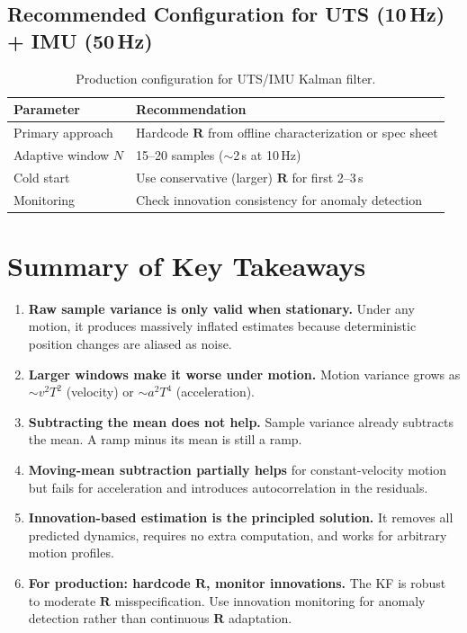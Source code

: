 \documentclass[11pt,a4paper]{article}
\begin{document}
\subsection{Recommended Configuration for UTS (10\,Hz) + IMU (50\,Hz)}

\begin{table}[H]
\centering
\begin{tabular}{@{}ll@{}}
\toprule
\textbf{Parameter} & \textbf{Recommendation} \\
\midrule
Primary approach    & Hardcode $\mathbf{R}$ from offline characterization or spec sheet \\
Adaptive window $N$ & 15--20 samples ($\sim$2\,s at 10\,Hz) \\
Cold start          & Use conservative (larger) $\mathbf{R}$ for first 2--3\,s \\
Monitoring          & Check innovation consistency for anomaly detection \\
\bottomrule
\end{tabular}
\caption{Production configuration for UTS/IMU Kalman filter.}
\end{table}

\section{Summary of Key Takeaways}

\begin{enumerate}
    \item \textbf{Raw sample variance is only valid when stationary.} Under any motion, it produces massively inflated estimates because deterministic position changes are aliased as noise.

    \item \textbf{Larger windows make it worse under motion.} Motion variance grows as $\sim v^2T^2$ (velocity) or $\sim a^2T^4$ (acceleration).

    \item \textbf{Subtracting the mean does not help.} Sample variance already subtracts the mean. A ramp minus its mean is still a ramp.

    \item \textbf{Moving-mean subtraction partially helps} for constant-velocity motion but fails for acceleration and introduces autocorrelation in the residuals.

    \item \textbf{Innovation-based estimation is the principled solution.} It removes all predicted dynamics, requires no extra computation, and works for arbitrary motion profiles.

    \item \textbf{For production: hardcode $\mathbf{R}$, monitor innovations.} The KF is robust to moderate $\mathbf{R}$ misspecification. Use innovation monitoring for anomaly detection rather than continuous $\mathbf{R}$ adaptation.
\end{enumerate}
\end{document}
